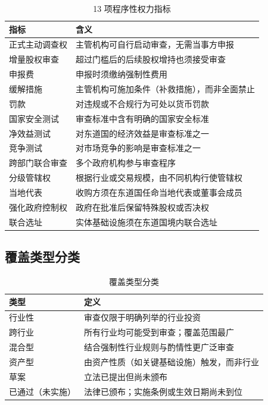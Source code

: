 \documentclass[12pt,a4paper]{article}
\begin{document}
\begin{table}[h]
\centering
\begin{tabularx}{\linewidth}{lX}
\toprule
\textbf{指标} & \textbf{含义} \\
\midrule
正式主动调查权 & 主管机构可自行启动审查，无需当事方申报 \\
增量股权审查 & 超过门槛后的后续股权增持也须接受审查 \\
申报费 & 申报时须缴纳强制性费用 \\
缓解措施 & 主管机构可施加条件（补救措施），而非全面禁止 \\
罚款 & 对违规或不合规行为可处以货币罚款 \\
国家安全测试 & 审查标准中含有明确的国家安全标准 \\
净效益测试 & 对东道国的经济效益是审查标准之一 \\
竞争测试 & 对市场竞争的影响是审查标准之一 \\
跨部门联合审查 & 多个政府机构参与审查程序 \\
分级管辖权 & 根据行业或交易规模，由不同机构行使管辖权 \\
当地代表 & 收购方须在东道国任命当地代表或董事会成员 \\
强化政府控制权 & 政府在批准后保留特殊股权或否决权 \\
联合选址 & 实体基础设施须在东道国境内联合选址 \\
\bottomrule
\end{tabularx}
\caption{13 项程序性权力指标}
\end{table}

\subsection{覆盖类型分类}

\begin{table}[h]
\centering
\begin{tabularx}{\linewidth}{lX}
\toprule
\textbf{类型} & \textbf{定义} \\
\midrule
行业性 & 审查仅限于明确列举的行业投资 \\
跨行业 & 所有行业均可能受到审查；覆盖范围最广 \\
混合型 & 结合强制性行业规则与酌情性更广泛审查 \\
资产型 & 由资产性质（如关键基础设施）触发，而非行业 \\
草案 & 立法已提出但尚未颁布 \\
已通过（未实施） & 法律已颁布；实施条例或生效日期尚未到位 \\
\bottomrule
\end{tabularx}
\caption{覆盖类型分类}
\end{table}
\end{document}
